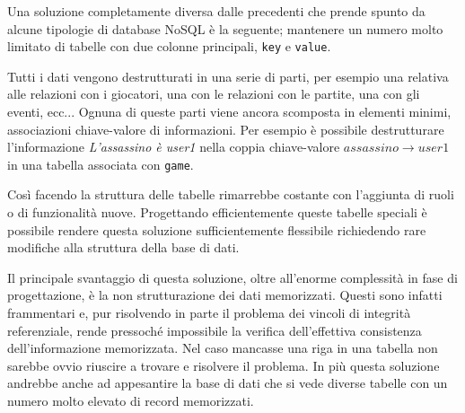Una soluzione completamente diversa dalle precedenti che prende spunto da alcune tipologie di database NoSQL è la seguente; mantenere un numero molto limitato di tabelle con due colonne principali, \texttt{key} e \texttt{value}.

Tutti i dati vengono destrutturati in una serie di parti, per esempio una relativa alle relazioni con i giocatori, una con le relazioni con le partite, una con gli eventi, ecc... Ognuna di queste parti viene ancora scomposta in elementi minimi, associazioni chiave-valore di informazioni. Per esempio è possibile destrutturare l'informazione \emph{L'assassino è user1} nella coppia chiave-valore $assassino \rightarrow user1$ in una tabella associata con \texttt{game}.

Così facendo la struttura delle tabelle rimarrebbe costante con l'aggiunta di ruoli o di funzionalità nuove. Progettando efficientemente queste tabelle speciali è possibile rendere questa soluzione sufficientemente flessibile richiedendo rare modifiche alla struttura della base di dati.

Il principale svantaggio di questa soluzione, oltre all'enorme complessità in fase di progettazione, è la non strutturazione dei dati memorizzati. Questi sono infatti frammentari e, pur risolvendo in parte il problema dei vincoli di integrità referenziale, rende pressoché impossibile la verifica dell'effettiva consistenza dell'informazione memorizzata. Nel caso mancasse una riga in una tabella non sarebbe ovvio riuscire a trovare e risolvere il problema. In più questa soluzione andrebbe anche ad appesantire la base di dati che si vede diverse tabelle con un numero molto elevato di record memorizzati.